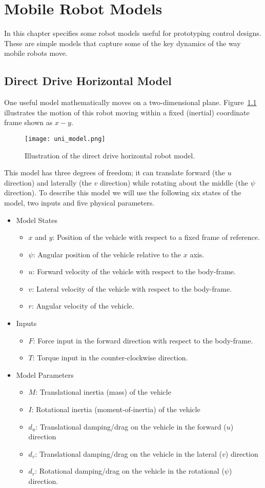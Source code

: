 \chapter{Mobile Robot Models}\label{c:models}
In this chapter specifies some robot models useful for prototyping control designs.  These are simple models that capture some of the key dynamics of the way mobile robots move.  
\section{Direct Drive Horizontal Model}
One useful model mathematically moves on a two-dimensional plane.  Figure~\ref{f:uni_model} illustrates the motion of this robot moving within a fixed (inertial) coordinate frame shown as $x-y$.
\begin{figure}[hbt]
\centering
\texttt{[image: uni\_model.png]}
\caption{Illustration of the direct drive horizontal robot model.}
\label{f:uni_model}
\end{figure}

This model has three degrees of freedom; it can translate forward (the $u$ direction) and laterally (the $v$ direction) while rotating about the middle (the $\psi$ direction).  To describe this model we will use the following six states of the model, two inputs and five physical parameters.
\begin{itemize}
\item Model States
\begin{itemize}
\item $x$ and $y$: Position of the vehicle with respect to a fixed frame of reference.
\item $\psi$: Angular position of the vehicle relative to the $x$ axis.
\item $u$: Forward velocity of the vehicle with respect to the body-frame.
\item $v$: Lateral velocity of the vehicle with respect to the body-frame.
\item $r$: Angular velocity of the vehicle.
\end{itemize}
\item Inputs
\begin{itemize}
\item $F$: Force input in the forward direction with respect to the body-frame.
\item $T$: Torque input in the counter-clockwise direction.
\end{itemize}
\item Model Parameters
\begin{itemize}
\item $M$: Translational inertia (mass) of the vehicle
\item $I$: Rotational inertia (moment-of-inertia) of the vehicle
\item $d_u$: Translational damping/drag on the vehicle in the forward ($u$) direction
\item $d_v$: Translational damping/drag on the vehicle in the lateral ($v$) direction
\item $d_r$: Rotational damping/drag on the vehicle in the rotational ($\psi$) direction.
\end{itemize}
\end{itemize}

